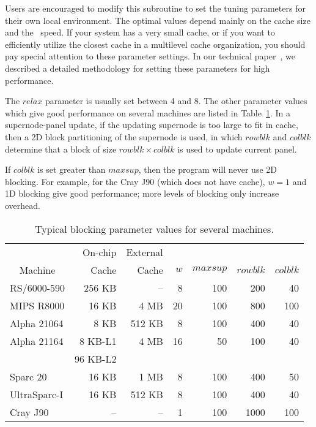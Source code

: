 Users are encouraged to modify this subroutine to set
the tuning parameters for their own local environment.
The optimal values depend mainly on the cache size and the \BLAS\ speed. 
If your system has a very small cache, or if you want to efficiently 
utilize the closest cache in a multilevel cache organization, you should 
pay special attention to these parameter settings. 
In our technical paper~\cite{superlu99}, we described a detailed methodology 
for setting these parameters for high performance.

The $relax$ parameter is usually set between 4 and 8. The other parameter
values which give good performance on several machines are listed in
Table~\ref{tab:block_params}. In a supernode-panel update, if the updating
supernode is too large to fit in cache, then a 2D block partitioning of
the supernode is used, in which $rowblk$ and $colblk$ determine that a 
block of size $rowblk\times colblk$ is used to update current panel.

If $colblk$ is set greater than $maxsup$, then the program will never
use 2D blocking. For example, for the Cray J90 (which does not have cache), 
$w=1$ and 1D blocking give good performance; more levels of blocking only 
increase overhead.

\begin{table}
\begin{small}
\begin{center}
\begin{tabular}{|l|r r r r r r|} \hline
\multicolumn{1}{|c|}{} &
\multicolumn{1}{r}{On-chip} &
\multicolumn{1}{r}{External} &
\multicolumn{1}{r}{} &
\multicolumn{1}{r}{} &
\multicolumn{1}{r}{} &
\multicolumn{1}{r|}{} \\
\multicolumn{1}{|c|}{Machine} &
\multicolumn{1}{r}{Cache} &
\multicolumn{1}{r}{Cache} &
\multicolumn{1}{r}{$w$} &
\multicolumn{1}{r}{$maxsup$} &
\multicolumn{1}{r}{$rowblk$} &
\multicolumn{1}{r|}{$colblk$} \\ \hline
RS/6000-590	&256 KB		&--	&8	&100 	&200	&40\\
MIPS R8000	&16 KB		&4 MB	&20	&100	&800	&100\\
Alpha 21064	&8 KB		&512 KB	&8	&100	&400	&40\\
Alpha 21164	&8 KB-L1	&4 MB	&16	&50	&100	&40\\
 		&96 KB-L2	&	&	&	&	&\\
Sparc 20	&16 KB		&1 MB	&8	&100	&400	&50\\
UltraSparc-I	&16 KB		&512 KB	&8	&100	&400	&40\\
Cray J90	&--		&--	&1	&100	&1000	&100\\
\hline
\end{tabular}
\end{center}
\end{small}
\vspace*{-.1in}
\caption{Typical blocking parameter values for several machines.}
\label{tab:block_params}
\end{table}



